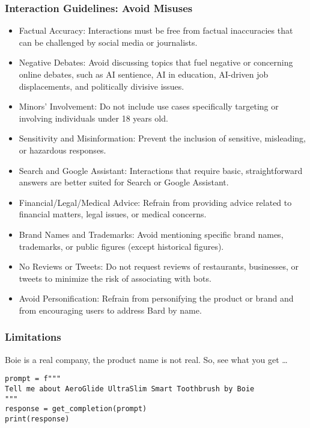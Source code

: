 \begin{frame}[fragile]\frametitle{Interaction Guidelines: Avoid Misuses}

\begin{itemize}
\item Factual Accuracy: Interactions must be free from factual inaccuracies that can be challenged by social media or journalists.
\item Negative Debates: Avoid discussing topics that fuel negative or concerning online debates, such as AI sentience, AI in education, AI-driven job displacements, and politically divisive issues.
\item Minors' Involvement: Do not include use cases specifically targeting or involving individuals under 18 years old.
\item Sensitivity and Misinformation: Prevent the inclusion of sensitive, misleading, or hazardous responses.
\item Search and Google Assistant: Interactions that require basic, straightforward answers are better suited for Search or Google Assistant.
\item Financial/Legal/Medical Advice: Refrain from providing advice related to financial matters, legal issues, or medical concerns.
\item Brand Names and Trademarks: Avoid mentioning specific brand names, trademarks, or public figures (except historical figures).
\item No Reviews or Tweets: Do not request reviews of restaurants, businesses, or tweets to minimize the risk of associating with bots.
\item Avoid Personification: Refrain from personifying the product or brand and from encouraging users to address Bard by name.
\end{itemize}	 
\end{frame}


\begin{frame}[fragile]\frametitle{Limitations}


Boie is a real company, the product name is not real. So, see what you get \ldots

\begin{lstlisting}
prompt = f"""
Tell me about AeroGlide UltraSlim Smart Toothbrush by Boie
"""
response = get_completion(prompt)
print(response)
\end{lstlisting}	 
		
\end{frame}



